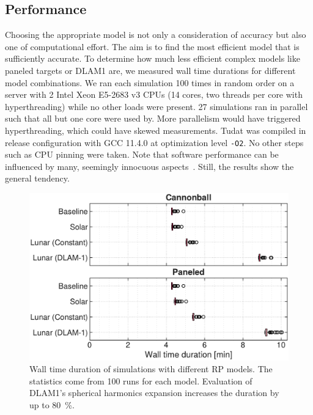 \subsection{Performance}
Choosing the appropriate model is not only a consideration of accuracy but also one of computational effort. The aim is to find the most efficient model that is sufficiently accurate. To determine how much less efficient complex models like paneled targets or \gls{DLAM1} are, we measured wall time durations for different model combinations. We ran each simulation 100 times in random order on a server with 2 Intel Xeon E5-2683 v3 CPUs (14 cores, two threads per core with hyperthreading) while no other loads were present. 27 simulations ran in parallel such that all but one core were used by. More parallelism would have triggered hyperthreading, which could have skewed measurements. \gls{Tudat} was compiled in release configuration with GCC 11.4.0 at optimization level \texttt{-O2}. No other steps such as CPU pinning were taken. Note that software performance can be influenced by many, seemingly innocuous aspects~\cite{Mytkowicz2009}. Still, the results show the general tendency.

\begin{figure}[b]
    \centering
    \includegraphics[width=\linewidth]{figures/plots/performance.pdf}
    \caption{Wall time duration of simulations with different \gls{RP} models. The statistics come from 100 runs for each model. Evaluation of \gls{DLAM1}'s spherical harmonics expansion increases the duration by up to \qty{80}{\percent}.}
    \label{fig:performance}
\end{figure}

